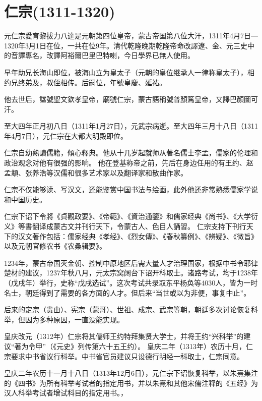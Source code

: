
\section{仁宗\tiny(1311-1320)}

元仁宗愛育黎拔力八達是元朝第四位皇帝，蒙古帝国第八位大汗，1311年4月7日—1320年3月1日在位，一共在位9年。清代乾隆晚期乾隆帝命改譯遼、金、元三史中的音譯專名，改譯阿裕爾巴里巴特喇，今日學界已無人使用。

早年助兄长海山即位，被海山立为皇太子（元朝的皇位继承人一律称皇太子），相约兄终弟及，叔侄相传。后嗣位，年號皇慶、延祐。

他去世后，諡號聖文欽孝皇帝，廟號仁宗，蒙古語稱號普顏篤皇帝，又譯巴顏圖可汗。

至大四年正月初八日（1311年1月27日），元武宗病逝。至大四年三月十八日（1311年4月7日），元仁宗在大都大明殿即位。

仁宗自幼熟讀儒籍，傾心釋典。他从十几岁起就师从著名儒士李孟，儒家的伦理和政治观念对他有很强的影响。 他在登基称帝之前，先后在身边任用的有王约、赵孟頫、张养浩等汉儒和很多艺术家以及翻译家和散曲作家。

仁宗不仅能够读、写汉文，还能鉴赏中国书法与绘画，此外他还非常熟悉儒家学说和中国历史。

仁宗下诏下令將《貞觀政要》、《帝範》、《資治通鑒》和儒家经典《尚书》、《大学衍义》等書翻译成蒙古文并刊行天下，令蒙古人、色目人誦習。 仁宗支持下刊行天下的汉文著作包括：儒家经典《孝经》、《烈女傳》、《春秋纂例》、《辨疑》、《微旨》以及元朝官修农书《农桑辑要》。

1234年，蒙古帝国灭金朝、控制中原地区后需大量人才治理国家，根据中书令耶律楚材的建议，1237年秋八月，元太宗窝阔台下诏开科取士。诸路考试，均于1238年（戊戌年）举行，史称“戊戌选试”。这次考试共录取东平杨奂等4030人，皆为一时名士，朝廷得到了需要的各方面的人才。但后来“当世或以为非便，事复中止”。

后来的定宗（贵由）、宪宗（蒙哥）、世祖、成宗、武宗等朝，朝廷多次讨论恢复科举，但因为多种原因，一直没能实现。

皇庆改元（1312年）仁宗将其儒师王约特拜集贤大学士，并将王约“兴科举”的建议“著为令甲”（《元史》列传第六十五王约）。 皇庆二年（1313年）农历十月，仁宗要求中书省议行科举。中书省官员建议只设德行明经一科取士，仁宗同意。

皇庆二年农历十一月十八日（1313年12月6日），元仁宗下诏恢复科举，以朱熹集注的《四书》为所有科举考试者的指定用书，并以朱熹和其他宋儒注释的《五经》为汉人科举考试者增试科目的指定用书。，

